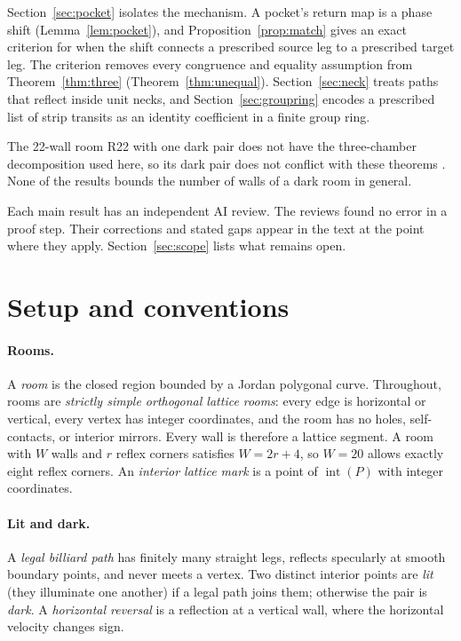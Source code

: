 \documentclass[11pt]{article}
\theoremstyle{definition}
\theoremstyle{remark}
\newcommand{\interior}{\operatorname{int}}
\begin{document}
Section~\ref{sec:pocket} isolates the mechanism. A pocket's return map is a
phase shift (Lemma~\ref{lem:pocket}), and Proposition~\ref{prop:match} gives an
exact criterion for when the shift connects a prescribed source leg to a
prescribed target leg. The criterion removes every congruence and equality
assumption from Theorem~\ref{thm:three} (Theorem~\ref{thm:unequal}).
Section~\ref{sec:neck} treats paths that reflect inside unit necks, and
Section~\ref{sec:groupring} encodes a prescribed list of strip transits as an
identity coefficient in a finite group ring.

The 22-wall room R22 with one dark pair does not have the three-chamber
decomposition used here, so its dark pair does not conflict with these
theorems \cite{d154,R1}. None of the results bounds the number of walls of a dark
room in general.

Each main result has an independent AI review. The reviews found no error in a
proof step. Their corrections and stated gaps appear in the text at the point
where they apply. Section~\ref{sec:scope} lists what remains open.

\section{Setup and conventions}\label{sec:setup}
\paragraph{Rooms.} A \emph{room} is the closed region bounded by a Jordan
polygonal curve. Throughout, rooms are \emph{strictly simple orthogonal lattice
rooms}: every edge is horizontal or vertical, every vertex has integer
coordinates, and the room has no holes, self-contacts, or interior mirrors.
Every wall is therefore a lattice segment. A room with $W$ walls and $r$ reflex
corners satisfies $W=2r+4$, so $W=20$ allows exactly eight reflex corners.
An \emph{interior lattice mark} is a point of $\interior(P)$ with integer
coordinates.

\paragraph{Lit and dark.} A \emph{legal billiard path} has finitely many
straight legs, reflects specularly at smooth boundary points, and never meets a
vertex. Two distinct interior points are \emph{lit} (they illuminate one
another) if a legal path joins them; otherwise the pair is \emph{dark}.
A \emph{horizontal reversal} is a reflection at a vertical wall, where the
horizontal velocity changes sign.
\end{document}
